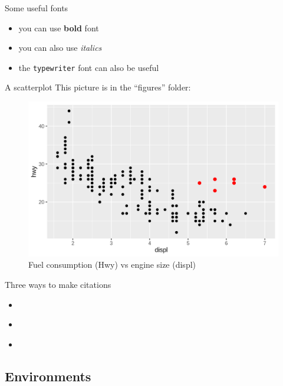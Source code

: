 \begin{frame}{Some useful fonts}
	\begin{itemize}
	\item you can use \textbf{bold} font
	\item you can also use \textit{italics} 
	\item the \texttt{typewriter} font can also be useful
	\end{itemize}
\end{frame}

\begin{frame}{A scatterplot}
	This picture is in the ``figures'' folder:
	\begin{figure}
	\includegraphics[scale=.5]{figures/graph.png}
	\caption{Fuel consumption (Hwy) vs engine size (displ)}
	\end{figure}
\end{frame}

\begin{frame}{Three ways to make citations}
	\begin{itemize}
	\item \cite{kass1995}
	\item \citep{kass1995}
	\item \citet{kass1995}
	\end{itemize}
\end{frame}

\subsection{Environments}

